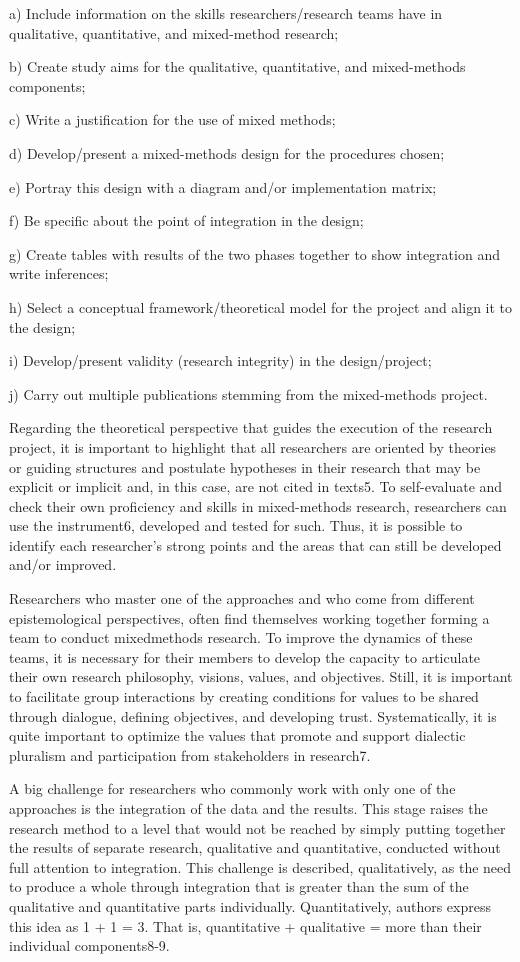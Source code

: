 a) Include information on the skills researchers/research teams have in qualitative, quantitative, and mixed-method research;

b) Create study aims for the qualitative, quantitative, and mixed-methods components;

c) Write a justification for the use of mixed methods;

d) Develop/present a mixed-methods design for the procedures chosen;

e) Portray this design with a diagram and/or implementation matrix;

f) Be specific about the point of integration in the design;

g) Create tables with results of the two phases together to show integration and write inferences;

h) Select a conceptual framework/theoretical model for the project and align it to the design;

i) Develop/present validity (research integrity) in the design/project;

j) Carry out multiple publications stemming from the mixed-methods project.

Regarding the theoretical perspective that guides the execution of the research project, it is important to highlight that all researchers are oriented by theories or guiding structures and postulate hypotheses in their research that may be explicit or implicit and, in this case, are not cited in texts5. To self-evaluate and check their own proficiency and skills in mixed-methods research, researchers can use the instrument6, developed and tested for such. Thus, it is possible to identify each researcher’s strong points and the areas that can still be developed and/or improved.

Researchers who master one of the approaches and who come from different epistemological perspectives, often find themselves working together forming a team to conduct mixedmethods research. To improve the dynamics of these teams, it is necessary for their members to develop the capacity to articulate their own research philosophy, visions, values, and objectives. Still, it is important to facilitate group interactions by creating conditions for values to be shared through dialogue, defining objectives, and developing trust. Systematically, it is quite important to optimize the values that promote and support dialectic pluralism and participation from stakeholders in research7.

A big challenge for researchers who commonly work with only one of the approaches is the integration of the data and the results. This stage raises the research method to a level that would not be reached by simply putting together the results of separate research, qualitative and quantitative, conducted without full attention to integration. This challenge is described, qualitatively, as the need to produce a whole through integration that is greater than the sum of the qualitative and quantitative parts individually. Quantitatively, authors express this idea as 1 + 1 = 3. That is, quantitative + qualitative = more than their individual components8-9.

